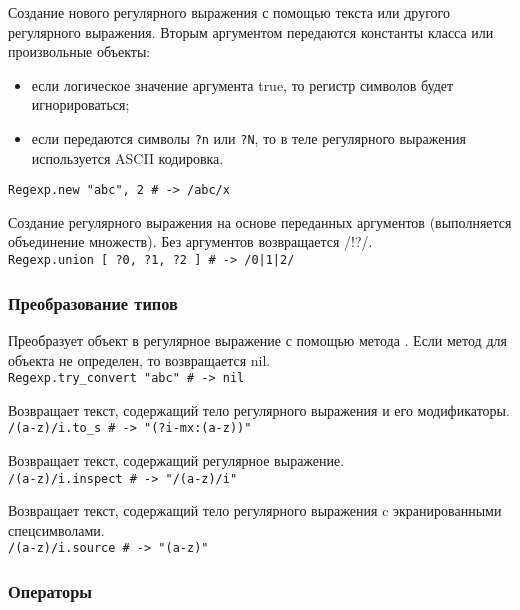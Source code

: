 \begin{methodlist}
  Создание нового регулярного выражения с помощью текста или другого регулярного выражения. Вторым аргументом передаются константы класса или произвольные объекты:
  \begin{itemize}
    \item если логическое значение аргумента true, то регистр символов будет игнорироваться;

    \item если передаются символы \verb!?n! или \verb!?N!, то в теле регулярного выражения используется ASCII кодировка.
  \end{itemize}
  \verb!Regexp.new "abc", 2 # -> /abc/x!

  Создание регулярного выражения на основе переданных аргументов (выполняется объединение множеств). Без аргументов возвращается /!?/.
  \\\verb!Regexp.union [ ?0, ?1, ?2 ] # -> /0|1|2/!
\end{methodlist}

\subsubsection*{Преобразование типов}

\begin{methodlist}
  Преобразует объект в регулярное выражение с помощью метода . Если метод для объекта не определен, то возвращается nil.
  \\\verb!Regexp.try_convert "abc" # -> nil!

  Возвращает текст, содержащий тело регулярного выражения и его модификаторы.
  \\\verb!/(a-z)/i.to_s # -> "(?i-mx:(a-z))"!

  Возвращает текст, содержащий регулярное выражение.
  \\\verb!/(a-z)/i.inspect # -> "/(a-z)/i"!

  Возвращает текст, содержащий тело регулярного выражения c экранированными спецсимволами.
  \\\verb!/(a-z)/i.source # -> "(a-z)"!
\end{methodlist}

\subsubsection*{Операторы}

